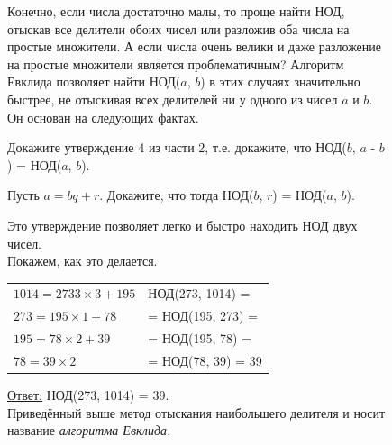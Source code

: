 \begin{figure}[H]
\begin{minipage}{0.74\linewidth}
    Конечно, если числа достаточно малы, то проще найти НОД, отыскав все делители обоих чисел или разложив оба числа на простые множители. А если числа очень велики и даже разложение на простые множители является проблематичным? Алгоритм Евклида позволяет найти НОД($a$, $b$) в этих случаях значительно быстрее, не отыскивая всех делителей ни у одного из чисел $a$ и $b$. Он основан на следующих фактах.
    \begin{thm}
        Докажите утверждение 4 из части 2, т.е. докажите, что НОД($b$, $a$ - $b$) = НОД($a$, $b$).
    \end{thm}
    \begin{thm}
        Пусть $a = bq + r$. Докажите, что тогда НОД($b$, $r$) = НОД($a$, $b$).
    \end{thm}
    Это утверждение позволяет легко и быстро находить НОД двух чисел.
    \\
    Покажем, как это делается.

{
\begin{tabular}{ll}
$1014 = 2733 \times 3 + 195$ & НОД(273, 1014) = \\
$273 = 195 \times 1 + 78$ & = НОД(195, 273) = \\
$195 = 78 \times 2 + 39$ & = НОД(195, 78) = \\
$78 = 39 \times 2$ & = НОД(78, 39) = 39 \\
\end{tabular}
}

    \noindent \underline{Ответ:} НОД(273, 1014) = 39. \hfill \qedsymbol
\\
Приведённый выше метод отыскания наибольшего делителя и носит название \textit{алгоритма Евклида.}


\end{minipage}
\end{figure}
